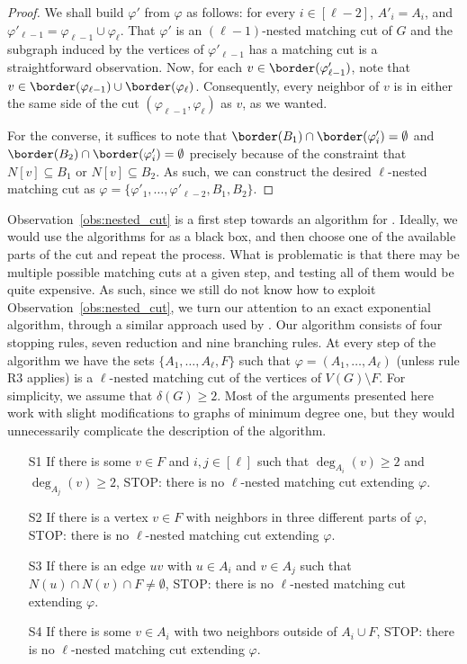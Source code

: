 \begin{proof}
	We shall build $\varphi'$ from $\varphi$ as follows: for every $i \in [\ell - 2]$, $A'_i = A_i$, and $\varphi'_{\ell - 1} = \varphi_{\ell - 1} \cup \varphi_\ell$.
	That $\varphi'$ is an $(\ell - 1)$-nested matching cut of $G$ and the subgraph induced by the vertices of $\varphi'_{\ell - 1}$ has a matching cut is a straightforward observation.
	Now, for each $v \in \border(\varphi'_{\ell - 1})$, note that $v \in \border(\varphi_{\ell - 1}) \cup \border(\varphi_\ell)$.
	Consequently, every neighbor of $v$ is in either the same side of the cut $(\varphi_{\ell - 1}, \varphi_\ell)$ as $v$, as we wanted.
	
	For the converse, it suffices to note that $\border(B_1) \cap \border(\varphi'_i) = \emptyset$ and $\border(B_2) \cap \border(\varphi'_i) = \emptyset$ precisely because of the constraint that $N[v] \subseteq B_1$ or $N[v] \subseteq B_2$.
	As such, we can construct the desired $\ell$-nested matching cut as $\varphi = \{\varphi'_1, \dots, \varphi'_{\ell - 2}, B_1, B_2\}$.
\end{proof}

Observation~\ref{obs:nested_cut} is a first step towards an algorithm for .
Ideally,  we would use the algorithms for  as a black box, and then choose one of the available parts of the cut and repeat the process.
What is problematic is that there may be multiple possible matching cuts at a given step, and testing all of them would be quite expensive.
As such, since we still do not know how to exploit Observation~\ref{obs:nested_cut}, we turn our attention to an exact exponential algorithm, through a similar approach used by \cite{matching_cut_ipec}.
Our algorithm consists of four stopping rules, seven reduction and nine branching rules.
At every step of the algorithm we have the sets $\{A_1, \dots, A_\ell, F\}$ such that $\varphi = (A_1, \dots, A_\ell)$ (unless rule R3 applies) is a $\ell$-nested matching cut of the vertices of $V(G) \setminus F$.
For simplicity, we assume that $\delta(G) \geq 2$.
Most of the arguments presented here work with slight modifications to graphs of minimum degree one, but they would unnecessarily complicate the description of the algorithm.

\begin{itemize}
	\item[S1] If there is some $v \in F$ and $i,j \in [\ell]$ such that $\deg_{A_i}(v) \geq 2$ and $\deg_{A_j}(v) \geq 2$, STOP: there is no $\ell$-nested matching cut extending $\varphi$.
	\item[S2] If there is a vertex $v \in F$ with neighbors in three different parts of $\varphi$, STOP: there is no $\ell$-nested matching cut extending $\varphi$.
	\item[S3] If there is an edge $uv$ with $u \in A_i$ and $v \in A_j$ such that $N(u) \cap N(v) \cap F \neq \emptyset$, STOP: there is no $\ell$-nested matching cut extending $\varphi$.
	\item[S4] If there is some $v \in A_i$ with two neighbors outside of $A_i \cup F$, STOP: there is no $\ell$-nested matching cut extending $\varphi$.
\end{itemize}

